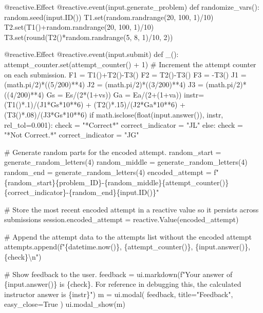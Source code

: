 \documentclass[
  letterpaper,
  DIV=11,
  numbers=noendperiod]{scrreprt}
\newenvironment{Shaded}{\begin{snugshade}}{\end{snugshade}}
\newcommand{\NormalTok}[1]{\textcolor[rgb]{0.00,0.23,0.31}{#1}}
\begin{document}
\begin{Shaded}
\begin{Highlighting}[]
\NormalTok{    @reactive.Effect}
\NormalTok{    @reactive.event(input.generate\_problem)}
\NormalTok{    def randomize\_vars():}
\NormalTok{        random.seed(input.ID())}
\NormalTok{        T1.set(random.randrange(20, 100, 1)/10)}
\NormalTok{        T2.set(T1()+random.randrange(20, 100, 1)/10)}
\NormalTok{        T3.set(round(T2()*random.randrange(5, 8, 1)/10, 2))}
        
\NormalTok{    @reactive.Effect}
\NormalTok{    @reactive.event(input.submit)}
\NormalTok{    def \_():}
\NormalTok{        attempt\_counter.set(attempt\_counter() + 1)  \# Increment the attempt counter on each submission.}
\NormalTok{        F1 = T1()+T2(){-}T3()}
\NormalTok{        F2 = T2(){-}T3()}
\NormalTok{        F3 = {-}T3()}
\NormalTok{        J1 = (math.pi/2)*((5/200)**4)}
\NormalTok{        J2 = (math.pi/2)*((3/200)**4)}
\NormalTok{        J3 = (math.pi/2)*((4/200)**4)}
\NormalTok{        Gs = Es/(2*(1+vs))}
\NormalTok{        Ga = Ea/(2+(1+va))}
\NormalTok{        instr= (T1()*.1)/(J1*Gs*10**6) + (T2()*.15)/(J2*Ga*10**6) + (T3()*.08)/(J3*Gs*10**6)}
\NormalTok{        if math.isclose(float(input.answer()), instr, rel\_tol=0.001):}
\NormalTok{            check = "*Correct*"}
\NormalTok{            correct\_indicator = "JL"}
\NormalTok{        else:}
\NormalTok{            check = "*Not Correct.*"}
\NormalTok{            correct\_indicator = "JG"}

\NormalTok{        \# Generate random parts for the encoded attempt.}
\NormalTok{        random\_start = generate\_random\_letters(4)}
\NormalTok{        random\_middle = generate\_random\_letters(4)}
\NormalTok{        random\_end = generate\_random\_letters(4)}
\NormalTok{        encoded\_attempt = f"\{random\_start\}\{problem\_ID\}{-}\{random\_middle\}\{attempt\_counter()\}\{correct\_indicator\}{-}\{random\_end\}\{input.ID()\}"}

\NormalTok{        \# Store the most recent encoded attempt in a reactive value so it persists across submissions}
\NormalTok{        session.encoded\_attempt = reactive.Value(encoded\_attempt)}

\NormalTok{        \# Append the attempt data to the attempts list without the encoded attempt}
\NormalTok{        attempts.append(f"\{datetime.now()\}, \{attempt\_counter()\}, \{input.answer()\}, \{check\}\textbackslash{}n")}

\NormalTok{        \# Show feedback to the user.}
\NormalTok{        feedback = ui.markdown(f"Your answer of \{input.answer()\} is \{check\}. For reference in debugging this, the calculated instructor answer is \{instr\}")}
\NormalTok{        m = ui.modal(}
\NormalTok{            feedback,}
\NormalTok{            title="Feedback",}
\NormalTok{            easy\_close=True}
\NormalTok{        )}
\NormalTok{        ui.modal\_show(m)}


\end{Highlighting}
\end{Shaded}
\end{document}
